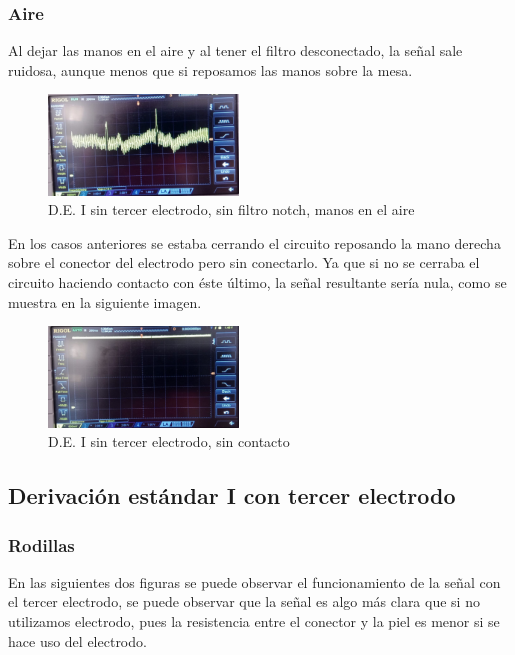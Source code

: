 \documentclass[conference]{IEEEtran}
\begin{document}
\subsubsection{Aire}
Al dejar las manos en el aire y al tener el filtro desconectado, la señal sale ruidosa, aunque menos que si reposamos las manos sobre la mesa.
\begin{figure}[H]
    \centerline{\includegraphics[width=0.45\textwidth]{d_SINelectrodo_SINnotch_aire.jpg}}
    \caption{D.E. I sin tercer electrodo, sin filtro notch, manos en el aire}
    \end{figure}

En los casos anteriores se estaba cerrando el circuito reposando la mano derecha sobre el conector del electrodo pero sin conectarlo. Ya que si no se cerraba el circuito haciendo contacto con éste último, la señal resultante sería nula, como se muestra en la siguiente imagen.
\begin{figure}[H]
    \centerline{\includegraphics[width=0.45\textwidth]{d_SinElectrodo_sintocar.jpg}}
    \caption{D.E. I sin tercer electrodo, sin contacto}
    \end{figure}

\subsection{Derivación estándar I con tercer electrodo}
\subsubsection{Rodillas}
En las siguientes dos figuras se puede observar el funcionamiento de la señal con el tercer electrodo, se puede observar que la señal es algo más clara que si no utilizamos electrodo, pues la resistencia entre el conector y la piel es menor si se hace uso del electrodo.
\end{document}
